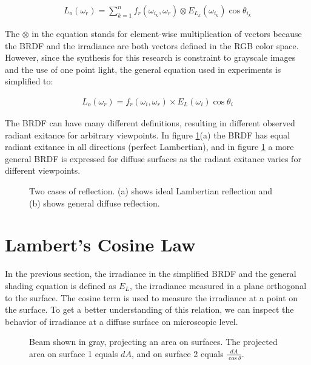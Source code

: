 		\begin{eqnarray*}
			L_o(\omega_r) = \sum_{k=1}^n f_r(\omega_{i_k}, \omega_r) \otimes E_{L_k}(\omega_{i_k})\cos\theta_{i_k}
		\end{eqnarray*}

\noindent The $\otimes$ in the equation stands for element-wise multiplication of vectors because the BRDF and the irradiance are both vectors defined in the RGB color space. However, since the synthesis for this research is constraint to grayscale images and the use of one point light, the general equation used in experiments is simplified to:

		\begin{eqnarray*}
			L_o(\omega_r) = f_r(\omega_{i}, \omega_r) \times E_{L}(\omega_{i})\cos\theta_{i}
		\end{eqnarray*}

The BRDF can have many different definitions, resulting in different observed radiant exitance for arbitrary viewpoints. In figure \ref{fig:BRDF}(a) the BRDF has equal radiant exitance in all directions (perfect Lambertian), and in figure \ref{fig:BRDF} a more general BRDF is expressed for diffuse surfaces as the radiant exitance varies for different viewpoints.

\begin{figure}[H]
	\begin{center}
	\end{center}
	\caption{Two cases of reflection. (a) shows ideal Lambertian reflection and (b) shows general diffuse reflection.}
	\label{fig:BRDF}
\end{figure}

\section{Lambert's Cosine Law}

In the previous section, the irradiance in the simplified BRDF and the general shading equation is defined as $E_L$, the irradiance measured in a plane orthogonal to the surface. The cosine term is used to measure the irradiance at a point on the surface. To get a better understanding of this relation, we can inspect the behavior of irradiance at a diffuse surface on microscopic level.

\begin{figure}[H]
	\begin{center}
	\end{center}
	\caption{Beam shown in gray, projecting an area on surfaces. The projected area on surface 1 equals $dA$, and on surface 2 equals $\frac{dA}{\cos\theta}$. }
	\label{fig:BEAM}
\end{figure}

